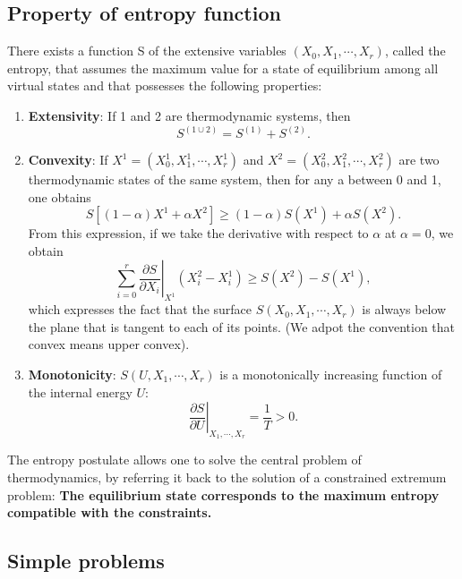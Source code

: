 \subsection{Property of entropy function}
There exists a function S of the extensive variables $(X_0, X_1, \cdots, X_r)$, called the entropy, that assumes the maximum value for a state of equilibrium among all virtual states and that possesses the following properties:
\begin{enumerate}
\item \textbf{Extensivity}: If 1 and 2 are thermodynamic systems, then 
\[ S^{(1 \cup 2)} = S^{(1)} + S^{(2)} .\]
\item \textbf{Convexity}: If $ X^1 = (X_0^1, X_1^1, \cdots, X_r^1)$ and $X^2 = (X_0^2, X_1^2, \cdots, X_r^2)$ are two thermodynamic states of the same system, then for any a between 0 and 1, one obtains
\[ S[(1-\alpha)X^1 + \alpha X^2] \geq (1 - \alpha)S(X^1) + \alpha S(X^2) .\]
From this expression, if we take the derivative with respect to $\alpha$ at $\alpha = 0$, we obtain
\[\left. \sum_{i=0}^{r} \frac{\partial S}{\partial X_i} \right|_{X^1} (X_i^2 - X_i^1) \geq S(X^2) - S(X^1) ,\]
which expresses the fact that the surface $S(X_0, X_1, \cdots, X_r)$ is always below the plane that
is tangent to each of its points. (We adpot the convention that convex means upper convex).
\item \textbf{Monotonicity}: $S(U, X_1, \cdots, X_r)$ is a monotonically increasing function of the internal energy $U$:
\[\left. \frac{\partial S}{\partial U} \right|_{X_1,\cdots,X_r} = \frac{1}{T} > 0.\]
\end{enumerate}
The entropy postulate allows one to solve the central problem of thermodynamics, by referring it back to the solution of a constrained extremum problem:
\textbf{The equilibrium state corresponds to the maximum entropy compatible with the constraints.}

\subsection{Simple problems}
